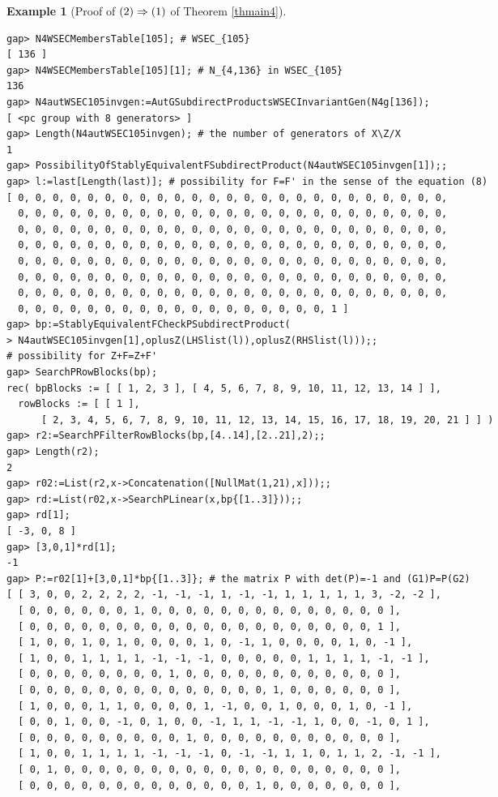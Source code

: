 \documentclass{amsart}
\theoremstyle{plain}
\theoremstyle{definition}
\newtheorem{example}[theorem]{Example}
\theoremstyle{remark}
\begin{document}
\begin{example}[Proof of ${\rm (2)}\Rightarrow {\rm (1)}$ of {Theorem \ref{thmain4}}]
\begin{verbatim}
gap> N4WSECMembersTable[105]; # WSEC_{105}
[ 136 ]
gap> N4WSECMembersTable[105][1]; # N_{4,136} in WSEC_{105}
136
gap> N4autWSEC105invgen:=AutGSubdirectProductsWSECInvariantGen(N4g[136]);
[ <pc group with 8 generators> ]
gap> Length(N4autWSEC105invgen); # the number of generators of X\Z/X
1
gap> PossibilityOfStablyEquivalentFSubdirectProduct(N4autWSEC105invgen[1]);;
gap> l:=last[Length(last)]; # possibility for F=F' in the sense of the equation (8)
[ 0, 0, 0, 0, 0, 0, 0, 0, 0, 0, 0, 0, 0, 0, 0, 0, 0, 0, 0, 0, 0, 0, 0, 0, 0, 
  0, 0, 0, 0, 0, 0, 0, 0, 0, 0, 0, 0, 0, 0, 0, 0, 0, 0, 0, 0, 0, 0, 0, 0, 0, 
  0, 0, 0, 0, 0, 0, 0, 0, 0, 0, 0, 0, 0, 0, 0, 0, 0, 0, 0, 0, 0, 0, 0, 0, 0, 
  0, 0, 0, 0, 0, 0, 0, 0, 0, 0, 0, 0, 0, 0, 0, 0, 0, 0, 0, 0, 0, 0, 0, 0, 0, 
  0, 0, 0, 0, 0, 0, 0, 0, 0, 0, 0, 0, 0, 0, 0, 0, 0, 0, 0, 0, 0, 0, 0, 0, 0, 
  0, 0, 0, 0, 0, 0, 0, 0, 0, 0, 0, 0, 0, 0, 0, 0, 0, 0, 0, 0, 0, 0, 0, 0, 0, 
  0, 0, 0, 0, 0, 0, 0, 0, 0, 0, 0, 0, 0, 0, 0, 0, 0, 0, 0, 0, 0, 0, 0, 0, 0, 
  0, 0, 0, 0, 0, 0, 0, 0, 0, 0, 0, 0, 0, 0, 0, 0, 0, 0, 1 ]
gap> bp:=StablyEquivalentFCheckPSubdirectProduct(
> N4autWSEC105invgen[1],oplusZ(LHSlist(l)),oplusZ(RHSlist(l)));;
# possibility for Z+F=Z+F' 
gap> SearchPRowBlocks(bp);
rec( bpBlocks := [ [ 1, 2, 3 ], [ 4, 5, 6, 7, 8, 9, 10, 11, 12, 13, 14 ] ], 
  rowBlocks := [ [ 1 ], 
      [ 2, 3, 4, 5, 6, 7, 8, 9, 10, 11, 12, 13, 14, 15, 16, 17, 18, 19, 20, 21 ] ] )
gap> r2:=SearchPFilterRowBlocks(bp,[4..14],[2..21],2);;
gap> Length(r2);
2
gap> r02:=List(r2,x->Concatenation([NullMat(1,21),x]));;
gap> rd:=List(r02,x->SearchPLinear(x,bp{[1..3]}));;
gap> rd[1];
[ -3, 0, 8 ]
gap> [3,0,1]*rd[1];
-1
gap> P:=r02[1]+[3,0,1]*bp{[1..3]}; # the matrix P with det(P)=-1 and (G1)P=P(G2)
[ [ 3, 0, 0, 2, 2, 2, 2, -1, -1, -1, 1, -1, -1, 1, 1, 1, 1, 1, 3, -2, -2 ], 
  [ 0, 0, 0, 0, 0, 0, 1, 0, 0, 0, 0, 0, 0, 0, 0, 0, 0, 0, 0, 0, 0 ], 
  [ 0, 0, 0, 0, 0, 0, 0, 0, 0, 0, 0, 0, 0, 0, 0, 0, 0, 0, 0, 0, 1 ], 
  [ 1, 0, 0, 1, 0, 1, 0, 0, 0, 0, 1, 0, -1, 1, 0, 0, 0, 0, 1, 0, -1 ], 
  [ 1, 0, 0, 1, 1, 1, 1, -1, -1, -1, 0, 0, 0, 0, 0, 1, 1, 1, 1, -1, -1 ], 
  [ 0, 0, 0, 0, 0, 0, 0, 0, 1, 0, 0, 0, 0, 0, 0, 0, 0, 0, 0, 0, 0 ], 
  [ 0, 0, 0, 0, 0, 0, 0, 0, 0, 0, 0, 0, 0, 0, 1, 0, 0, 0, 0, 0, 0 ], 
  [ 1, 0, 0, 0, 1, 1, 0, 0, 0, 0, 1, -1, 0, 0, 1, 0, 0, 0, 1, 0, -1 ], 
  [ 0, 0, 1, 0, 0, -1, 0, 1, 0, 0, -1, 1, 1, -1, -1, 1, 0, 0, -1, 0, 1 ], 
  [ 0, 0, 0, 0, 0, 0, 0, 0, 0, 1, 0, 0, 0, 0, 0, 0, 0, 0, 0, 0, 0 ], 
  [ 1, 0, 0, 1, 1, 1, 1, -1, -1, -1, 0, -1, -1, 1, 1, 0, 1, 1, 2, -1, -1 ], 
  [ 0, 1, 0, 0, 0, 0, 0, 0, 0, 0, 0, 0, 0, 0, 0, 0, 0, 0, 0, 0, 0 ], 
  [ 0, 0, 0, 0, 0, 0, 0, 0, 0, 0, 0, 0, 0, 1, 0, 0, 0, 0, 0, 0, 0 ], 

\end{verbatim}
\end{example}
\end{document}
